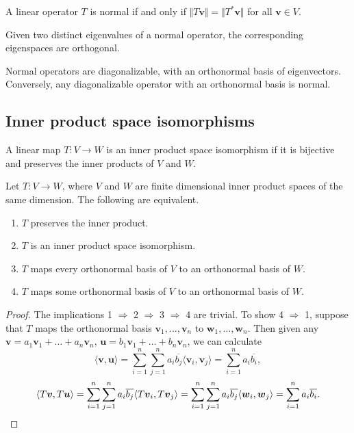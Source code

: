 \documentclass[11pt]{article}
\renewcommand{\vec}[1]{\boldsymbol{#1}}
\newcommand{\vu}{\vec{u}}
\newcommand{\vv}{\vec{v}}
\newcommand{\vw}{\vec{w}}
\newcommand{\ip}[2]{\langle #1, #2 \rangle}
\newcommand{\norm}[1]{\Vert #1 \Vert}
\theoremstyle{definition}
\theoremstyle{remark}
\numberwithin{equation}{section}
\begin{document}
    \begin{lemma}
        A linear operator $T$ is normal if and only if $\norm{T\vv} = \norm{T^*\vv}$
        for all $\vv \in V$.
    \end{lemma}
    \begin{corollary}
        Given two distinct eigenvalues of a normal operator, the corresponding
        eigenspaces are orthogonal.
    \end{corollary}

    \begin{theorem}
        Normal operators are diagonalizable, with an orthonormal basis of
        eigenvectors. Conversely, any diagonalizable operator with an orthonormal
        basis is normal.
    \end{theorem}


    \subsection{Inner product space isomorphisms}
    \begin{definition}
        A linear map $T\colon V \to W$ is an inner product space isomorphism if it is
        bijective and preserves the inner products of $V$ and $W$.
    \end{definition}

    \begin{theorem}
        Let $T\colon V \to W$, where $V$ and $W$ are finite dimensional inner product
        spaces of the same dimension. The following are equivalent. \begin{enumerate}
            \itemsep0em
            \item $T$ preserves the inner product.
            \item $T$ is an inner product space isomorphism.
            \item $T$ maps every orthonormal basis of $V$ to an orthonormal basis of
            $W$.
            \item $T$ maps some orthonormal basis of $V$ to an orthonormal basis of
            $W$.
        \end{enumerate}
    \end{theorem}
    \begin{proof}
        The implications 1 $\Rightarrow$ 2 $\Rightarrow$ 3 $\Rightarrow$ 4 are
        trivial. To show 4 $\Rightarrow$ 1, suppose that $T$ maps the orthonormal
        basis $\vv_1, \dots, \vv_n$ to $\vw_1, \dots, \vw_n$. Then given any $\vv =
        a_1\vv_1 + \dots + a_n\vv_n$, $\vu = b_1\vv_1 + \dots + b_n\vv_n$, we can
        calculate \[
            \ip{\vv}{\vu} = \sum_{i = 1}^n\sum_{j = 1}^n
            a_i\overline{b_j}\ip{\vv_i}{\vv_j} = \sum_{i = 1}^n
            a_i\overline{b_i},
        \] \[
            \ip{T\vv}{T\vu} = \sum_{i = 1}^n\sum_{j = 1}^n
            a_i\overline{b_j}\ip{T\vv_i}{T\vv_j} = \sum_{i = 1}^n\sum_{j = 1}^n
            a_i\overline{b_j}\ip{\vw_i}{\vw_j} = \sum_{i = 1}^n
            a_i\overline{b_i}. \qedhere
        \] 
    \end{proof}
\end{document}
